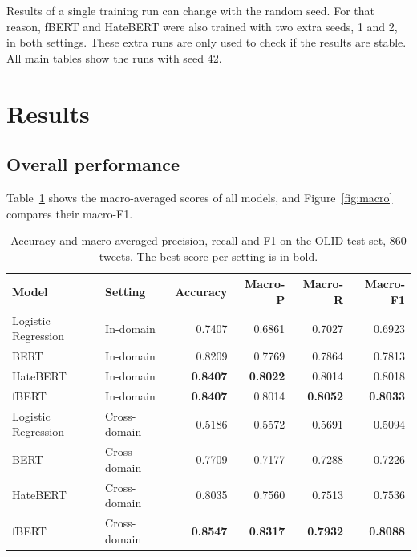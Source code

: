 \documentclass[11pt,a4paper]{article}
\begin{document}
Results of a single training run can change with the random seed. For that reason, fBERT and HateBERT were also trained with two extra seeds, 1 and 2, in both settings. These extra runs are only used to check if the results are stable. All main tables show the runs with seed 42.

\section{Results}

\subsection{Overall performance}

Table~\ref{tab:overall} shows the macro-averaged scores of all models, and Figure~\ref{fig:macro} compares their macro-F1.

\begin{table}[H]
\centering
\caption{Accuracy and macro-averaged precision, recall and F1 on the OLID test set, 860 tweets. The best score per setting is in bold.}
\label{tab:overall}
\begin{tabular}{llrrrr}
\toprule
Model & Setting & Accuracy & Macro-P & Macro-R & Macro-F1 \\
\midrule
Logistic Regression & In-domain    & 0.7407 & 0.6861 & 0.7027 & 0.6923 \\
BERT                & In-domain    & 0.8209 & 0.7769 & 0.7864 & 0.7813 \\
HateBERT            & In-domain    & \textbf{0.8407} & \textbf{0.8022} & 0.8014 & 0.8018 \\
fBERT               & In-domain    & \textbf{0.8407} & 0.8014 & \textbf{0.8052} & \textbf{0.8033} \\
\midrule
Logistic Regression & Cross-domain & 0.5186 & 0.5572 & 0.5691 & 0.5094 \\
BERT                & Cross-domain & 0.7709 & 0.7177 & 0.7288 & 0.7226 \\
HateBERT            & Cross-domain & 0.8035 & 0.7560 & 0.7513 & 0.7536 \\
fBERT               & Cross-domain & \textbf{0.8547} & \textbf{0.8317} & \textbf{0.7932} & \textbf{0.8088} \\
\bottomrule
\end{tabular}
\end{table}
\end{document}
